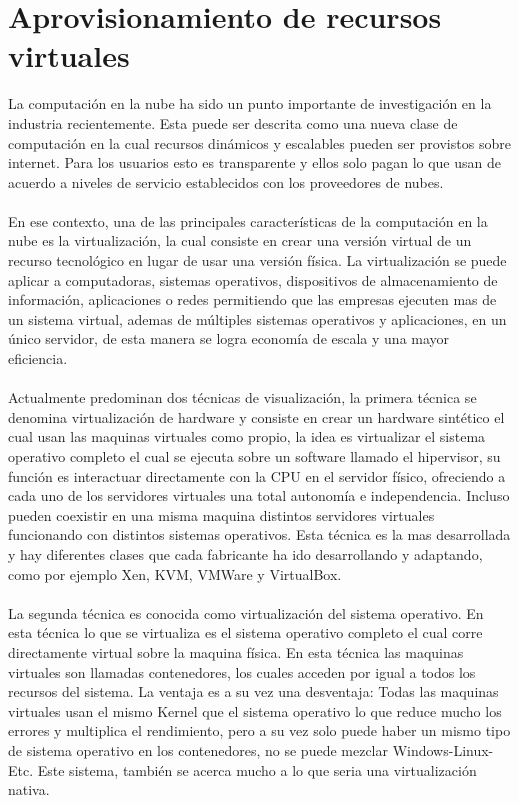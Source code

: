 
\chapter{Aprovisionamiento de recursos virtuales}

\label{aprmaqvir}
La computación en la nube ha sido un punto importante de investigación en la industria recientemente. Esta puede ser descrita como una nueva clase de computación en la cual recursos dinámicos y escalables pueden ser provistos sobre internet. Para los usuarios esto es transparente y ellos solo pagan lo que usan de acuerdo a niveles de servicio establecidos con los proveedores de nubes.\\
\\
En ese contexto, una de las principales características de la computación en la nube es la virtualización, la cual consiste en crear una versión virtual de un recurso tecnológico en lugar de usar una versión física. La virtualización se puede aplicar a computadoras, sistemas operativos, dispositivos de almacenamiento de información, aplicaciones o redes permitiendo que las empresas ejecuten mas de un sistema virtual, ademas de múltiples sistemas operativos y aplicaciones, en un único servidor, de esta manera se logra economía de escala y una mayor eficiencia.\\
\\
Actualmente predominan dos técnicas de visualización, la primera técnica se denomina virtualización de hardware y consiste en crear un hardware sintético el cual usan las maquinas virtuales como propio, la idea es virtualizar el sistema operativo completo el cual se ejecuta sobre un software llamado el hipervisor, su función es interactuar directamente con la CPU en el servidor físico, ofreciendo a cada uno de los servidores virtuales una total autonomía e independencia. Incluso pueden coexistir en una misma maquina distintos servidores virtuales funcionando con distintos sistemas operativos. Esta técnica es la mas desarrollada y hay diferentes clases que cada fabricante ha ido desarrollando y adaptando, como por ejemplo Xen, KVM, VMWare y VirtualBox.\\
\\
La segunda técnica es conocida como virtualización del sistema operativo. En esta técnica lo que se virtualiza es el sistema operativo completo el cual corre directamente virtual sobre la maquina física. En esta técnica las maquinas virtuales son llamadas contenedores, los cuales acceden por igual a todos los recursos del sistema. La ventaja es a su vez una desventaja: Todas las maquinas virtuales usan el mismo Kernel que el sistema operativo lo que reduce mucho los errores y multiplica el rendimiento, pero a su vez solo puede haber un mismo tipo de sistema operativo en los contenedores, no se puede mezclar Windows-Linux-Etc. Este sistema, también se acerca mucho a lo que seria una virtualización nativa.\\
